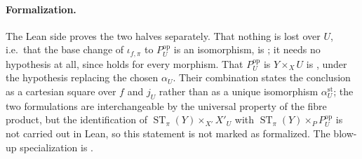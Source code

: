 \begin{lemma}
  \paragraph{Formalization.}
  The Lean side proves the two halves separately.  That nothing is lost over $U$,
  i.e.\ that the base change of $\iota_{f,\pi}$ to $P_U^{\mathrm{op}}$ is an
  isomorphism, is
  \texttt{}; it needs
  no hypothesis at all, since
  \texttt{} holds for every
  morphism.  That $P_U^{\mathrm{op}}$ is $Y\times_XU$ is
  \texttt{}, under the
  hypothesis \texttt{} replacing the chosen $\alpha_U$.
  Their combination
  \texttt{} states the
  conclusion as a cartesian square over $f$ and $j_U$ rather than as a unique
  isomorphism $\alpha^{\mathrm{st}}_U$; the two formulations are interchangeable by the
  universal property of the fibre product, but the identification of
  $\operatorname{ST}_\pi(Y)\times_{X'}X'_U$ with
  $\operatorname{ST}_\pi(Y)\times_PP_U^{\mathrm{op}}$ is not carried out in Lean, so this
  statement is not marked as formalized.  The blow-up specialization is
  \texttt{}.
\end{lemma}

